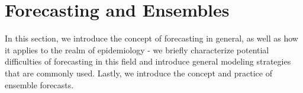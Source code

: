 \section{Forecasting and Ensembles}
In this section, we introduce the concept of forecasting in general, as well as how it applies to the realm of epidemiology - we briefly characterize potential difficulties of forecasting in this field and introduce general modeling strategies that are commonly used. Lastly, we introduce the concept and practice of ensemble forecasts.
